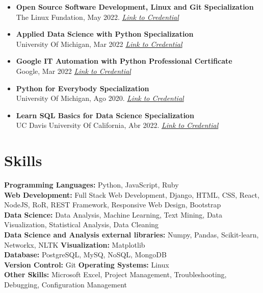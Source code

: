 \documentclass[a4paper,10pt]{article}
\begin{document}
\begin{itemize}[left=0pt]
			\item \textbf{Open Source Software Development, Linux and Git Specialization} \\
			The Linux Fundation, May 2022.
			\textit{\href{https://portfolio-mparraf.herokuapp.com/static/shared/Open Source Software Development, Linux and Git.pdf}{Link to Credential}}
			
			\item \textbf{Applied Data Science with Python Specialization} \\
			University Of Michigan, Mar 2022
			\textit{\href{https://portfolio-mparraf.herokuapp.com/static/shared/Applied Data Science with Python.pdf}{Link to Credential}}

			\item \textbf{Google IT Automation with Python Professional Certificate} \\
			Google, Mar 2022
			\textit{\href{https://portfolio-mparraf.herokuapp.com/static/shared/Google IT  Automation with Python.pdf}{Link to Credential}}
			
			\item \textbf{Python for Everybody Specialization} \\
			University Of Michigan, Ago 2020. \textit{\href{https://portfolio-mparraf.herokuapp.com/static/shared/PythonforEverybodySpecialization.pdf}{Link to Credential}}
			
			
			\item \textbf{Learn SQL Basics for Data Science Specialization} \\
			UC Davis University Of California, Abr 2022.
			\textit{\href{https://portfolio-mparraf.herokuapp.com/static/shared/Learn SQL Basics for Data Science Specialization.pdf}{Link to Credential}}
			
	
	\end{itemize}
	
	
	\section*{Skills}
	\textbf{Programming Languages:} Python, JavaScript, Ruby \\
	\textbf{Web Development:} Full Stack Web Development, Django, HTML, CSS, React, NodeJS, RoR, REST Framework, Responsive Web Design, Bootstrap \\
	\textbf{Data Science:} Data Analysis, Machine Learning, Text Mining, Data Visualization, Statistical Analysis, Data Cleaning \\
	\textbf{Data Science and Analysis external libraries:} Numpy, Pandas, Scikit-learn, Networkx, NLTK
	\textbf{Visualization:} Matplotlib \\
	\textbf{Database:} PostgreSQL, MySQ, NoSQL, MongoDB \\
	\textbf{Version Control:} Git  \textbf{Operating Systems:} Linux \\
	\textbf{Other Skills:} Microsoft Excel, Project Management, Troubleshooting, Debugging, Configuration Management \\
\end{document}
